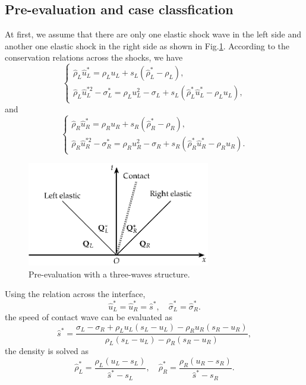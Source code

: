 \documentclass[review]{elsarticle}
\begin{document}
\subsection{Pre-evaluation and case classfication}\label{sec:eva}
At first, we assume that there are only one elastic shock wave in the left side and another one  elastic shock in the right side as shown in Fig.\ref{fig:HLLC}. According to the conservation relations across the shocks, we have    
\begin{equation}
  \left\{
  \begin{aligned}
	\hat{\rho}_L\hat{u}^*_L = \rho_L u_L +s_L(\hat{\rho}_L^*-\rho_L), \\
	\hat{\rho}_L\hat{u}_L^{*2}-\sigma_L^* = \rho_L u_L^2 -\sigma_L +s_L(\hat{\rho}_L^* \hat{u}_L^*-\rho_L u_L), 
  \end{aligned}
\right.
\end{equation}
and
\begin{equation}
  \left\{
  \begin{aligned}
	\hat{\rho}_R\hat{u}^*_R = \rho_R u_R +s_R(\hat{\rho}_R^*-\rho_R), \\
	\hat{\rho}_R\hat{u}_R^{*2}-\sigma_R^* = \rho_R u_R^2 -\sigma_R +s_R(\hat{\rho}_R^* \hat{u}_R^*-\rho_R u_R). 
  \end{aligned}
\right.
\end{equation}
\begin{figure}
  \centering
  \includegraphics[width=8cm]{Tikz-figure7.eps}
  \caption{Pre-evaluation with a three-waves structure.}
  \label{fig:HLLC}
\end{figure}


Using the relation across the interface,
\begin{equation}
  \hat{u}_L^* = \hat{u}_R^* =\hat{s}^*,\quad \hat{\sigma}_L^* = \hat{\sigma}_R^*.
\end{equation}
the speed of contact wave can be evaluated as 
\begin{equation}
\hat{s}^* = \frac{\sigma_L-\sigma_R+\rho_L u_L(s_L-u_L)-\rho_R u_R(s_R-u_R)}{\rho_L(s_L-u_L)-\rho_R(s_R-u_R)},
\end{equation}
the density is solved as 
\begin{equation}
\hat{\rho}_L^* = \frac{\rho_L(u_L-s_L)}{\hat{s}^*-s_L}, \quad
\hat{\rho}_R^* = \frac{\rho_R(u_R-s_R)}{\hat{s}^*-s_R}.
\end{equation}
\end{document}
